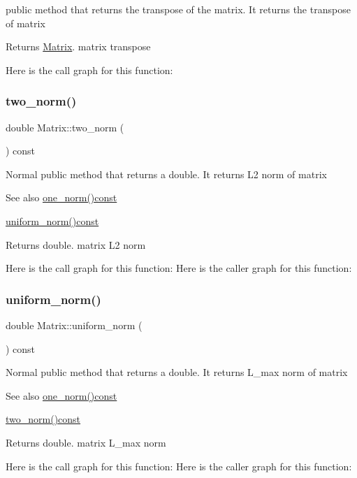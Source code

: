 public method that returns the transpose of the matrix. It returns the transpose of matrix \begin{DoxyReturn}{Returns}
\mbox{\hyperlink{class_matrix}{Matrix}}. matrix transpose 
\end{DoxyReturn}
Here is the call graph for this function\+:
\mbox{\label{class_matrix_aac496af05ec7aa26afc2b9c6d0ab8b66}} 
\subsubsection{\texorpdfstring{two\+\_\+norm()}{two\_norm()}}
{\footnotesize\ttfamily double Matrix\+::two\+\_\+norm (\begin{DoxyParamCaption}{ }\end{DoxyParamCaption}) const}

Normal public method that returns a double. It returns L2 norm of matrix \begin{DoxySeeAlso}{See also}
\mbox{\hyperlink{class_matrix_af4d468252f3ecbbcaa5726c76e332b4c}{one\+\_\+norm()const}} 

\mbox{\hyperlink{class_matrix_a43066c7fe6418aad40170b85415063e8}{uniform\+\_\+norm()const}} 
\end{DoxySeeAlso}
\begin{DoxyReturn}{Returns}
double. matrix L2 norm 
\end{DoxyReturn}
Here is the call graph for this function\+:
Here is the caller graph for this function\+:
\mbox{\label{class_matrix_a43066c7fe6418aad40170b85415063e8}} 
\subsubsection{\texorpdfstring{uniform\+\_\+norm()}{uniform\_norm()}}
{\footnotesize\ttfamily double Matrix\+::uniform\+\_\+norm (\begin{DoxyParamCaption}{ }\end{DoxyParamCaption}) const}

Normal public method that returns a double. It returns L\+\_\+max norm of matrix \begin{DoxySeeAlso}{See also}
\mbox{\hyperlink{class_matrix_af4d468252f3ecbbcaa5726c76e332b4c}{one\+\_\+norm()const}} 

\mbox{\hyperlink{class_matrix_aac496af05ec7aa26afc2b9c6d0ab8b66}{two\+\_\+norm()const}} 
\end{DoxySeeAlso}
\begin{DoxyReturn}{Returns}
double. matrix L\+\_\+max norm 
\end{DoxyReturn}
Here is the call graph for this function\+:
Here is the caller graph for this function\+:


